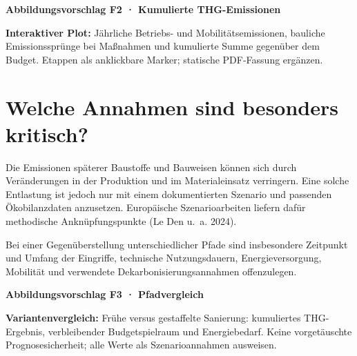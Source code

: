 \documentclass[
  ngerman,
  a4paper,
  DIV=11]{scrreprt}
\begin{document}
\begin{tcolorbox}[enhanced jigsaw, arc=.35mm, bottomrule=.15mm, breakable, colback=white, colframe=quarto-callout-note-color-frame, left=2mm, leftrule=.75mm, opacityback=0, rightrule=.15mm, toprule=.15mm]

\vspace{-3mm}\textbf{Abbildungsvorschlag F2 · Kumulierte THG-Emissionen}\vspace{3mm}

\textbf{Interaktiver Plot:} Jährliche Betriebs- und
Mobilitätsemissionen, bauliche Emissionssprünge bei Maßnahmen und
kumulierte Summe gegenüber dem Budget. Etappen als anklickbare Marker;
statische PDF-Fassung ergänzen.

\end{tcolorbox}

\section{Welche Annahmen sind besonders
kritisch?}\label{welche-annahmen-sind-besonders-kritisch}

Die Emissionen späterer Baustoffe und Bauweisen können sich durch
Veränderungen in der Produktion und im Materialeinsatz verringern. Eine
solche Entlastung ist jedoch nur mit einem dokumentierten Szenario und
passenden Ökobilanzdaten anzusetzen. Europäische Szenarioarbeiten
liefern dafür methodische Anknüpfungspunkte (Le Den u.~a. 2024).

Bei einer Gegenüberstellung unterschiedlicher Pfade sind insbesondere
Zeitpunkt und Umfang der Eingriffe, technische Nutzungsdauern,
Energieversorgung, Mobilität und verwendete Dekarbonisierungsannahmen
offenzulegen.

\begin{tcolorbox}[enhanced jigsaw, arc=.35mm, bottomrule=.15mm, breakable, colback=white, colframe=quarto-callout-tip-color-frame, left=2mm, leftrule=.75mm, opacityback=0, rightrule=.15mm, toprule=.15mm]

\vspace{-3mm}\textbf{Abbildungsvorschlag F3 · Pfadvergleich}\vspace{3mm}

\textbf{Variantenvergleich:} Frühe versus gestaffelte Sanierung:
kumuliertes THG-Ergebnis, verbleibender Budgetspielraum und
Energiebedarf. Keine vorgetäuschte Prognosesicherheit; alle Werte als
Szenarioannahmen ausweisen.

\end{tcolorbox}
\end{document}
